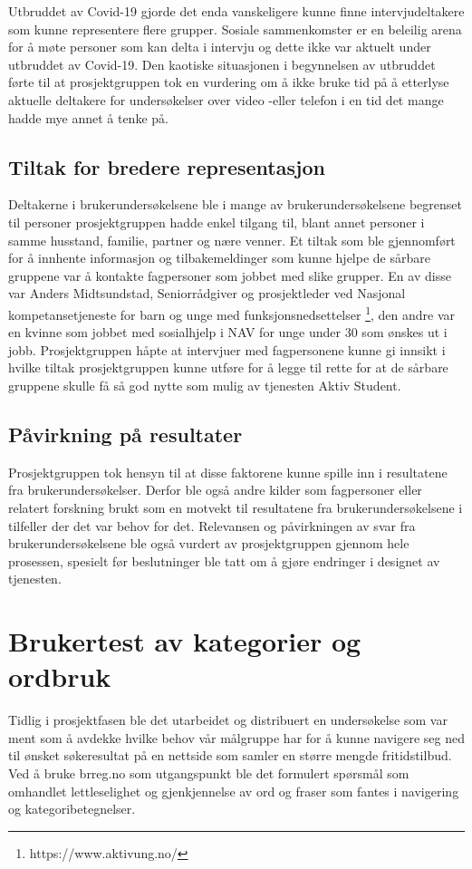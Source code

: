 Utbruddet av Covid-19 gjorde det enda vanskeligere kunne finne intervjudeltakere som kunne representere flere grupper. Sosiale sammenkomster er en beleilig arena for å møte personer som kan delta i intervju og dette ikke var aktuelt under utbruddet av Covid-19. Den kaotiske situasjonen i begynnelsen av utbruddet førte til at prosjektgruppen tok en vurdering om å ikke bruke tid på å etterlyse aktuelle deltakere for undersøkelser over video -eller telefon i en tid det mange hadde mye annet å tenke på. 

\subsection{Tiltak for bredere representasjon}
Deltakerne i brukerundersøkelsene ble i mange av brukerundersøkelsene begrenset til personer prosjektgruppen hadde enkel tilgang til, blant annet personer i samme husstand, familie, partner og nære venner. Et tiltak som ble gjennomført for å innhente informasjon og tilbakemeldinger som kunne hjelpe de sårbare gruppene var å kontakte fagpersoner som jobbet med slike grupper. En av disse var Anders Midtsundstad, Seniorrådgiver og prosjektleder ved Nasjonal kompetansetjeneste for barn og unge med funksjonsnedsettelser \footnote{https://www.aktivung.no/}, den andre var en kvinne som jobbet med sosialhjelp i NAV for unge under 30 som ønskes ut i jobb. Prosjektgruppen håpte at intervjuer med fagpersonene kunne gi innsikt i hvilke tiltak prosjektgruppen kunne utføre for å legge til rette for at de sårbare gruppene skulle få så god nytte som mulig av tjenesten Aktiv Student.

\subsection{Påvirkning på resultater}
Prosjektgruppen tok hensyn til at disse faktorene kunne spille inn i resultatene fra brukerundersøkelser. Derfor ble også andre kilder som fagpersoner eller relatert forskning brukt som en motvekt til resultatene fra brukerundersøkelsene i tilfeller der det var behov for det. Relevansen og påvirkningen av svar fra brukerundersøkelsene ble også vurdert av prosjektgruppen gjennom hele prosessen, spesielt før beslutninger ble tatt om å gjøre endringer i designet av tjenesten. 

\section{Brukertest av kategorier og ordbruk}
Tidlig i prosjektfasen ble det utarbeidet og distribuert en undersøkelse som var ment som å avdekke hvilke behov vår målgruppe har for å kunne navigere seg ned til ønsket søkeresultat på en nettside som samler en større mengde fritidstilbud.
Ved å bruke brreg.no som utgangspunkt ble det formulert spørsmål som omhandlet lettleselighet og gjenkjennelse av ord og fraser som fantes i navigering og kategoribetegnelser.

